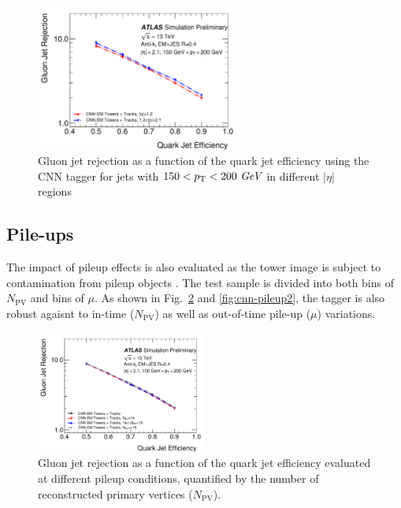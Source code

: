 \begin{figure}[htpb]
\begin{center}
 \includegraphics[width=0.6\textwidth]{figures/CNN/ROC_pt150_200_eta.pdf}
\caption{Gluon jet rejection as a function of the quark jet efficiency using the CNN tagger for jets with $150<p_{{\rm T}}<200~\textit{GeV}$ in different $|\eta|$ regions}
\label{fig:cnn-tracktruth}
\end{center}
\end{figure}

\subsection{Pile-ups}
\label{sec:cnn-pile-ups}

The impact of pileup effects is also evaluated as the tower image is subject to contamination from pileup objects
. The test sample is divided into both bins of $N_\text{PV}$
and bins of $\mu$. As shown in Fig.~\ref{fig:cnn-pileup} and \ref{fig:cnn-pileup2}, the tagger is also robust agaisnt
to in-time ($N_\text{PV}$) as well as out-of-time pile-up ($\mu$) variations.

\begin{figure}[htpb]
\begin{center}
\includegraphics[width=0.5\textwidth]{figures/CNN/ROC_pt150_200_NPV.pdf}
\caption{Gluon jet rejection as a function of the quark jet efficiency %
evaluated at different pileup conditions, 
quantified by the number of reconstructed primary vertices ($N_\text{PV}$).}
\label{fig:cnn-pileup}
\end{center}
\end{figure}

